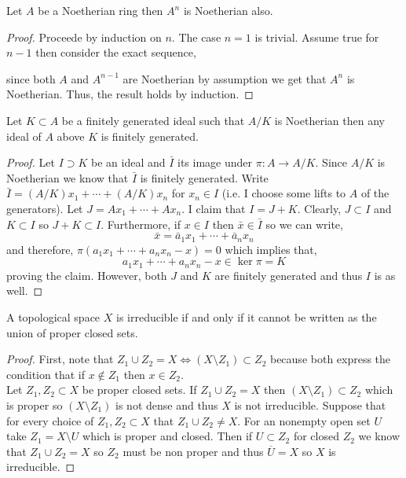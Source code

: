\documentclass[12pt]{extarticle}
\begin{document}
\begin{lemma} \label{powers_are_noetherian}
Let $A$ be a Noetherian ring then $A^n$ is Noetherian also.
\end{lemma}

\begin{proof}
Proceede by induction on $n$. The case $n = 1$ is trivial. Assume true for $n -1$ then consider the exact sequence,
\begin{center}
\end{center}  
since both $A$ and $A^{n-1}$ are Noetherian by assumption we get that $A^n$ is Noetherian. Thus, the result holds by induction.
\end{proof}

\begin{lemma} \label{finitely_generated_noetherian_quotient}
Let $K \subset A$ be a finitely generated ideal such that $A / K$ is Noetherian then any ideal of $A$ above $K$ is finitely generated.
\end{lemma}

\begin{proof}
Let $I \supset K$ be an ideal and $\bar{I}$ its image under $\pi : A \to A / K$. Since $A / K$ is Noetherian we know that $\bar{I}$ is finitely generated. Write $\bar{I} = (A/K) x_1 + \cdots + (A / K) x_n$ for $x_n \in I$ (i.e. I choose some lifts to $A$ of the generators). Let $J = A x_1 + \cdots + A x_n$. I claim that $I = J + K$. Clearly, $J \subset I$ and $K \subset I$ so $J + K \subset I$. Furthermore, if $x \in I$ then $\bar{x} \in \bar{I}$ so we can write,
\[ \bar{x} = \bar{a}_1 x_1 + \cdots + \bar{a}_n x_n \]
and therefore, $\pi(a_1 x_1 + \cdots + a_n x_n - x) = 0$ which implies that,
\[ a_1 x_1 + \cdots + a_n x_n - x \in \ker{\pi} = K \]
proving the claim. However, both $J$ and $K$ are finitely generated and thus $I$ is as well. 
\end{proof}

\begin{lemma} \label{irreducibility_criterion}
A topological space $X$ is irreducible if and only if it cannot be written as the union of proper closed sets.
\end{lemma}

\begin{proof}
First, note that $Z_1 \cup Z_2 = X \iff (X \setminus Z_1) \subset Z_2$ because both express the condition that if $x \notin Z_1$ then $x \in Z_2$. 
\bigskip\\
Let $Z_1, Z_2 \subset X$ be proper closed sets. If $Z_1 \cup Z_2 = X$ then $(X \setminus Z_1) \subset Z_2$ which is proper so $(X \setminus Z_1)$ is not dense and thus $X$ is not irreducible. Suppose that for every choice of $Z_1, Z_2 \subset X$ that $Z_1 \cup Z_2 \neq X$. For an nonempty open set $U$ take $Z_1 = X \setminus U$ which is proper and closed. Then if $U \subset Z_2$ for closed $Z_2$ we know that $Z_1 \cup Z_2 = X$ so $Z_2$ must be non proper and thus $\overline{U} = X$ so $X$ is irreducible.  
\end{proof}
\end{document}
